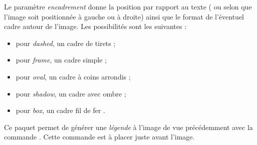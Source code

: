 Le paramètre \emph{encadrement} donne la position par rapport au texte ( ou  selon que l'image soit positionnée à gauche ou à droite) ainsi que le format de l'éventuel cadre autour de l'image. Les possibilités sont les suivantes :
\begin{itemize}
\item {} pour \emph{dashed}, un cadre de tirets ; 
\item {} pour \emph{frame}, un cadre simple ;
\item {} pour \emph{oval}, un cadre à coins arrondis ;
\item {} pour \emph{shadow}, un cadre avec ombre ;
\item {} pour \emph{box}, un cadre \og fil de fer \fg. \\
\end{itemize}

Ce paquet permet de générer une \emph{légende} à l'image de  vue précédemment avec la commande . Cette commande est à placer juste avant l'image.